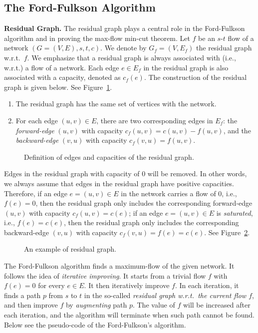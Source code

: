 \subsection*{The Ford-Fulkson Algorithm}

{\bf Residual Graph.} The residual graph plays a central role in the Ford-Fulkson algorithm and in
proving the max-flow min-cut theorem. Let $f$ be an $s$-$t$ flow of a network
$(G = (V,E),s,t,c)$. We denote by $G_f =(V,E_f)$ the residual graph w.r.t.\ $f$. 
We emphasize that a residual graph is always associated with (i.e., w.r.t.) a flow of a network.
Each edge $e\in E_f$ in the residual graph is also associated with a capacity, denoted as $c_f(e)$. 
The construction of the residual graph is given below.  See Figure~\ref{fig:residual-graph}.
\begin{enumerate}
\item The residual graph has the same set of vertices with the network.
\item For each edge $(u,v)\in E$, there are two corresponding edges in
$E_f$: the \emph{forward-edge} $(u,v)$ with capacity $c_f (u, v) = c(u,v) - f(u,v)$, 
and the \emph{backward-edge} $(v, u)$ with capacity $c_f (v, u) = f(u,v)$. 
\end{enumerate}

\begin{figure}[h]
\centering{}
\caption{Definition of edges and capacities of the residual graph.}
\label{fig:residual-graph}
\end{figure}

Edges in the residual graph with capacity of 0 will be removed. In other words,
we always assume that edges in the residual graph have positive
capacities. Therefore, if an edge $e = (u,v) \in E$ in the network carries a
flow of 0, i.e., $f(e) = 0$, then the residual graph only includes the
corresponding forward-edge $(u, v)$ with capacity $c_f (u, v) = c(e)$; if an
edge $e = (u, v) \in E$  is \emph{saturated}, i.e., $f (e) = c(e)$, then the residual
graph only includes the corresponding backward-edge $(v, u)$ with capacity
$c_f (v, u) = f(e) = c(e)$. See Figure~\ref{fig:example}.

\begin{figure}[h]
\centering{}
\caption{An example of residual graph.}
\label{fig:example}
\end{figure}

The Ford-Fulkson algorithm finds a maximum-flow of the given network.
It follows the idea of \emph{iterative improving}. It 
starts from a trivial flow $f$ with $f(e) = 0$ for every $e\in E$.
It then iteratively improve $f$.
In each iteration, it finds a path $p$ from $s$ to $t$ in the so-called \emph{residual graph w.r.t.\ the current flow $f$},
and then improve $f$ by \emph{augmenting} path $p$.
The value of $f$ will be increased after each iteration,
and the algorithm will terminate when such path cannot be found.
Below see the pseudo-code of the Ford-Fulkson's algorithm.


